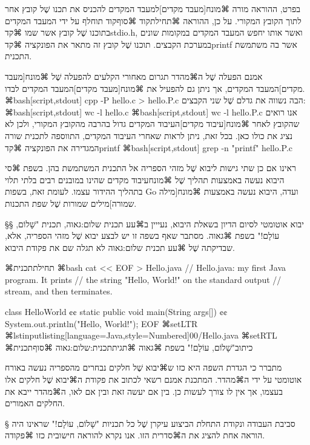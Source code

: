בפרט, ההוראה  מורה ⌘מונח[מעבד מקדים]{למעבד המקדים} להכניס את תכנו
שֶׁל קובץ אחר לתוך הקובץ המקורי. על כן, ההוראה
⌘תחילת{קוד}
⌘סוף{קוד}
תוחלף על ידי המעבד המקדים בתוכנו שֶׁל קובץ אשר שמו ⌘קד{stdio.h}, ואשר אותו יחפש
המעבד המקדים במקומות שונים במערכת הקבצים. תוכנו שֶׁל קובץ זה מתאר את הפונקציה
⌘קד{printf} אשר בה משתמשת התכנית.

אמנם הפעלה שֶׁל ה⌘מהדר תגרום מאחורי הקלעים להפעלה שֶׁל ⌘מונח[מעבד מקדים]{המעבד
  המקדים}, אך ניתן גם להפעיל את ⌘מונח[מעבד מקדים]{המעבד המקדים} לבדו.
⌘bash[script,stdout]
cpp -P hello.c > hello.P.c
\END
הבה נשווה את גדלם שֶׁל שני הקבצים:
⌘bash[script,stdout]
wc -l hello.c
\END
⌘bash[script,stdout]
wc -l hello.P.c
\END
אנו רואים שהקובץ לאחר ⌘מונח[עיבוד מקדים]{העיבוד המקדים} גדול בהרבה מהקובץ
המקורי, ולכן לא נציג את כולו כאן. בכל זאת, ניתן לראות שאחרי העיבוד המקדים,
התווספה לתכנית שורה המגדירה את הפונקציה ⌘קד{printf}
⌘bash[script,stdout]
grep -n "\<printf\>" hello.P.c
\END

ראינו אם כן שתי גישות ליבוא שֶׁל מזהי הספריה אל התכנית המשתמשת בהן. בשפת ⌘סי
היבוא נעשה באמצעות תהליך שֶׁל ⌘מונח{עיבוד מקדים} שהינו במובנים רבים בלתי תלוי
בתהליך ההידור עצמו. לעומת זאת, בשפות Go ועדה, היבוא נעשה באמצעות ⌘מונח[מילה
שמורה]{מילים שמורות} שֶׁל שפת התכנות.

§§ יבוא אוטומטי
לסיום הדיון בשאלת היבוא, נעייין ב⌘עע תכנית שלום:גאוה, תכנית "שָׁלוֹם, עוֹלָם!"
בשפת ⌘גאוה. מסתבר שאף בשפה זו יש לבצע יבוא שֶׁל מזהי הספריה, אלא, שבדיקתה שֶׁל
⌘עע תכנית שלום:גאוה לא תגלה שם את פקודת היבוא.

⌘תחילת{תכנית}
⌘bash
cat << EOF > Hello.java
// Hello.java: my first Java program. It prints
// the string "Hello, World!" on the standard output
// stream, and then terminates.

class HelloWorld {¢¢
  static public void main(String args[]) {¢¢
    System.out.println("Hello, World!");
  }
}
EOF
\END
⌘setLTR
⌘lstinputlisting[language=Java,style=Numbered]{00/Hello.java}
⌘setRTL
⌘כיתוב{"שָׁלוֹם, עוֹלָם!" בשפת ⌘גאוה}
⌘תגית{תכנית:שלום:גאוה}
⌘סוף{תכנית}

מתברר כי הגדרת השפה היא כזו ש⌘יבוא שֶׁל חלקים נבחרים מהספריה נעשה באורח אוטומטי
    על ידי ה⌘מהדר. המתכנת אמנם רשאי לכתוב את פקודת ה⌘יבוא שֶׁל חלקים אלו בעצמו,
    אך אין לו צורך לעשות כן. בין אם יעשה זאת ובין אם לאו, ה⌘מהדר ייבא את
    החלקים האמורים.

    § סביבת העבודה ונקודת התחלת הביצוע
    עיקרן שֶׁל כל תכניות "שָׁלוֹם, עוֹלָם!" שראינו היה הוראה אחת להציג את ה⌘סדרית הזו.
    אנו נקרא להוראה חישובית כזו ⌘פקודה.

